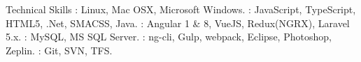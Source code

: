 \documentclass{resume}
\author{Rahmathullah M}
\begin{document}
\maketitle



\begin{category}{Technical Skills}
  : Linux, Mac OSX, Microsoft Windows.
  : JavaScript, TypeScript, HTML5, .Net, SMACSS, Java.
  : Angular 1 \& 8, VueJS, Redux(NGRX), Laravel 5.x.
  : MySQL, MS SQL Server.
  : ng-cli, Gulp, webpack, Eclipse, Photoshop, Zeplin.
  : Git, SVN, TFS.
\end{category} 

\end{document}
